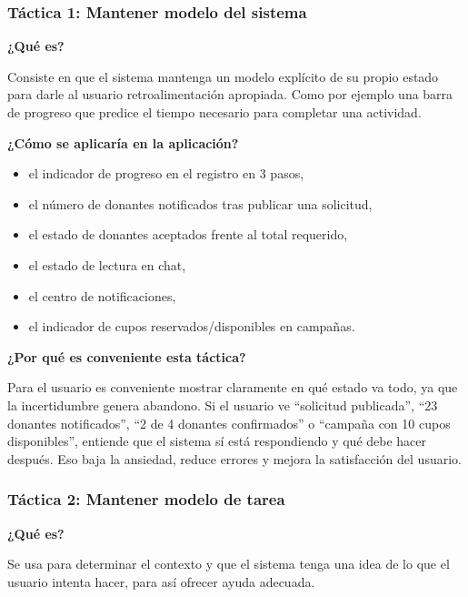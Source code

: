\subsubsection{Táctica 1: Mantener modelo del sistema}

\noindent\textbf{¿Qué es?}

Consiste en que el sistema mantenga un modelo explícito de su propio estado para darle al usuario retroalimentación apropiada. Como por ejemplo una barra de progreso que predice el tiempo necesario para completar una actividad.

\medskip
\noindent\textbf{¿Cómo se aplicaría en la aplicación?}

\begin{itemize}
    \item el indicador de progreso en el registro en 3 pasos,
    \item el número de donantes notificados tras publicar una solicitud,
    \item el estado de donantes aceptados frente al total requerido,
    \item el estado de lectura en chat,
    \item el centro de notificaciones,
    \item el indicador de cupos reservados/disponibles en campañas.
\end{itemize}

\medskip
\noindent\textbf{¿Por qué es conveniente esta táctica?}

Para el usuario es conveniente mostrar claramente en qué estado va todo, ya que la incertidumbre genera abandono. Si el usuario ve ``solicitud publicada'', ``23 donantes notificados'', ``2 de 4 donantes confirmados'' o ``campaña con 10 cupos disponibles'', entiende que el sistema sí está respondiendo y qué debe hacer después. Eso baja la ansiedad, reduce errores y mejora la satisfacción del usuario.

\subsubsection{Táctica 2: Mantener modelo de tarea}

\noindent\textbf{¿Qué es?}

Se usa para determinar el contexto y que el sistema tenga una idea de lo que el usuario intenta hacer, para así ofrecer ayuda adecuada.

